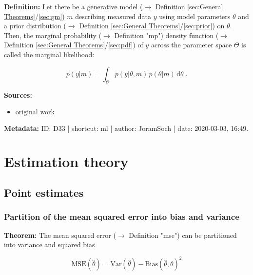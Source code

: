 \documentclass[a4paper,12pt]{book}
\begin{document}
\vspace{1em}
\textbf{Definition:} Let there be a generative model ($\rightarrow$ Definition \ref{sec:General Theorems}/\ref{sec:gm}) $m$ describing measured data $y$ using model parameters $\theta$ and a prior distribution ($\rightarrow$ Definition \ref{sec:General Theorems}/\ref{sec:prior}) on $\theta$. Then, the marginal probability ($\rightarrow$ Definition "mp") density function ($\rightarrow$ Definition \ref{sec:General Theorems}/\ref{sec:pdf}) of $y$ across the parameter space $\Theta$ is called the marginal likelihood:

\begin{equation} \label{eq:ml-ml}
p(y|m) = \int_{\Theta} p(y|\theta,m) \, p(\theta|m) \, \mathrm{d}\theta \; .
\end{equation}

\vspace{1em}
\textbf{Sources:}
\begin{itemize}
\item original work\end{itemize}


\vspace{1em}
\textbf{Metadata:} ID: D33 | shortcut: ml | author: JoramSoch | date: 2020-03-03, 16:49.


\pagebreak
\section{Estimation theory}

\subsection{Point estimates}

\subsubsection[\textbf{Partition of the mean squared error into bias and variance}]{Partition of the mean squared error into bias and variance} \label{sec:mse-bnv}

\vspace{1em}
\textbf{Theorem:} The mean squared error ($\rightarrow$ Definition "mse") can be partitioned into variance and squared bias

\begin{equation} \label{eq:mse-bnv-MSE}
\mathrm{MSE}(\hat{\theta}) = \mathrm{Var}(\hat{\theta}) - \mathrm{Bias}(\hat{\theta},\theta)^2
\end{equation}
\end{document}
